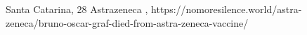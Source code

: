           {Santa Catarina, }
          {28}
          {Astrazeneca}
          {}
          {
            ,
          }
          {https://nomoresilence.world/astra-zeneca/bruno-oscar-graf-died-from-astra-zeneca-vaccine/}
